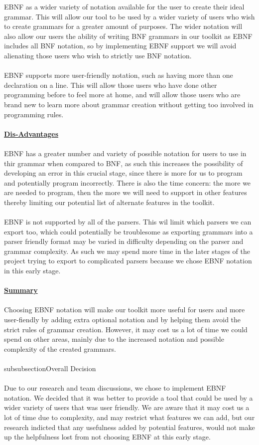 \documentclass{l3proj}
\begin{document}
EBNF as a wider variety of notation available for the user to create their ideal grammar. This will allow our tool to be used by a wider variety of users who wish to create grammars for a greater amount of purposes. The wider notation will also allow our users the ability of writing BNF grammars in our toolkit as EBNF includes all BNF notation, so by implementing EBNF support we will avoid alienating those users who wish to strictly use BNF notation. \\
\\
EBNF supports more user-friendly notation, such as having more than one declaration on a line. This will allow those users who have done other programming before to feel more at home, and will allow those users who are brand new to learn more about grammar creation without getting too involved in programming rules.\\
\\
\textbf {\underline{Dis-Advantages}}\\
\\
EBNF has a greater number and variety of possible notation for users to use in thir grammar when compared to BNF, as such this increases the possibility of developing an error in this crucial stage, since there is more for us to program and potentially program incorrectly. There is also the time concern: the more we are needed to program, then the more we will need to support in other features thereby limiting our potential list of alternate features in the toolkit.\\
\\
EBNF is not supported by all of the parsers. This wil limit which parsers we can export too, which could potentially be troublesome as exporting grammars into a parser friendly format may be varied in difficulty depending on the parser and grammar complexity. As such we may spend more time in the later stages of the project trying to export to complicated parsers because we chose EBNF notation in this early stage.\\
\\
\textbf {\underline{Summary}}\\
\\
Choosing EBNF notation will make our toolkit more useful for users and more user-fiendly by adding extra optional notation and by helping them avoid the strict rules of grammar creation. However, it may cost us a lot of time we could spend on other areas, mainly due to the increased notation and possible complexity of the created grammars.\\
\\subsubsection{Overall Decision}\\
\\
Due to our research and team discussions, we chose to implement EBNF notation. We decided that it was better to provide a tool that could be used by a wider variety of users that was user friendly. We are aware that it may cost us a lot of time due to complexity, and may restrict what features we can add, but our research indicted that any usefulness added by potential features, would not make up the helpfulness lost from not choosing EBNF at this early stage. \\
\\
\end{document}
